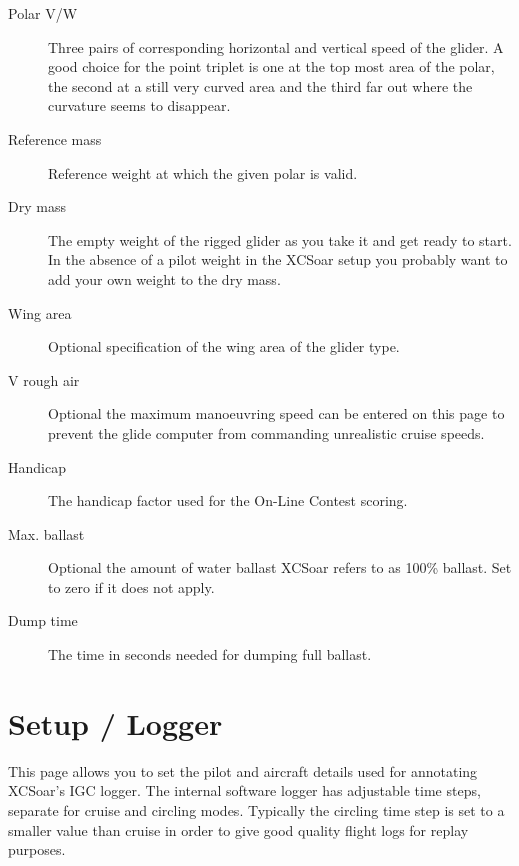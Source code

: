 \begin{description}
\item[Polar V/W]  Three pairs of corresponding horizontal and vertical speed of the glider. 
  A good choice for the point triplet is one at the top most area of the polar, the second at a 
  still very curved area and the third far out where the curvature seems to disappear.
\item[Reference mass]  Reference weight at which the given polar is valid.
\item[Dry mass]  The empty weight of the rigged glider as you take it and get ready to start. In the absence of a pilot weight in the XCSoar setup you probably want to add your own weight to the dry mass.
\item[Wing area]  Optional specification of the wing area of the glider type.
\item[V rough air] Optional the maximum manoeuvring speed can 
  be entered on this page to prevent the glide computer from commanding 
  unrealistic cruise speeds.
\item[Handicap]  The handicap factor used for the On-Line Contest scoring.
\item[Max. ballast]  Optional the amount of water ballast XCSoar refers to as 100\% ballast.
  Set to zero if it does not apply.
\item[Dump time]  The time in seconds needed for dumping full ballast.
\end{description}


\section{Setup / Logger} \label{conf:logger}

This page allows you to set the pilot and aircraft details used for
annotating XCSoar's IGC logger.  
The internal software logger has adjustable time steps, separate for
cruise and circling modes.  
Typically the circling time step is set to a smaller value
than cruise in order to give good quality flight logs for replay
purposes.

